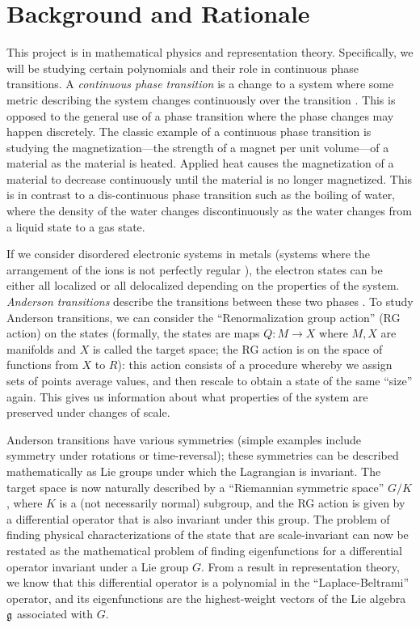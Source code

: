 \documentclass[11pt, reqno]{amsart}
\begin{document}
\section{Background and Rationale}




This project is in mathematical physics and representation theory. Specifically, we will be studying certain polynomials and their role in continuous phase transitions. A \emph{continuous phase transition} is a change to a system where some metric describing the system changes continuously over the transition \cite[\S1]{Sa06}. This is opposed to the general use of a phase transition where the phase changes may happen discretely. The classic example of a continuous phase transition is studying the magnetization---the strength of a magnet per unit volume---of a material as the material is heated. Applied heat causes the magnetization of a material to decrease continuously until the material is no longer magnetized. This is in contrast to a dis-continuous phase transition such as the boiling of water, where the density of the water changes discontinuously as the water changes from a liquid state to a gas state.

If we consider disordered electronic systems in metals (systems where the arrangement of the ions is not perfectly regular \cite{dicastro2006disordered}), the electron states can be either all localized or all delocalized depending on the properties of the system. \emph{Anderson transitions} describe the transitions between these two phases \cite{Evers_2008}. To study Anderson transitions, we can consider the ``Renormalization group action'' (RG action) on the states (formally, the states are maps $Q : M \to X$ where $M, X$ are manifolds and $X$ is called the target space; the RG action is on the space of functions from $X$ to $R$): this action consists of a procedure whereby we assign sets of points average values, and then rescale to obtain a state of the same ``size'' again. This gives us information about what properties of the system are preserved under changes of scale.

Anderson transitions have various symmetries (simple examples include symmetry under rotations or time-reversal); these symmetries can be described mathematically as Lie groups under which the Lagrangian is invariant. The target space is now naturally described by a ``Riemannian symmetric space'' $G/K$, where $K$ is a (not necessarily normal) subgroup, and the RG action is given by a differential operator that is also invariant under this group. The problem of finding physical characterizations of the state that are scale-invariant can now be restated as the mathematical problem of finding eigenfunctions for a differential operator invariant under a Lie group $G$. From a result in representation theory, we know that this differential operator is a polynomial in the ``Laplace-Beltrami'' operator, and its eigenfunctions are the highest-weight vectors of the Lie algebra $\mathfrak{g}$ associated with $G$. 
\end{document}
